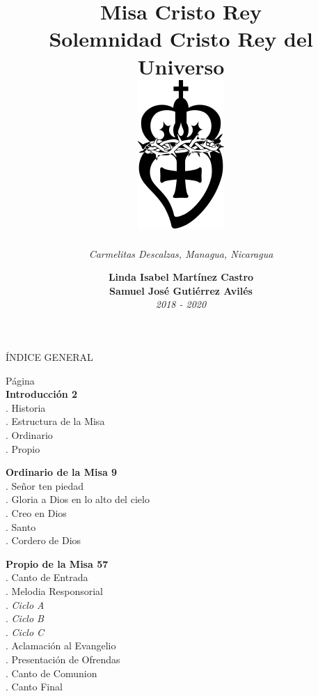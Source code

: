 \documentclass[12pt, letterpaper]{report}
\title{
  \textbf{ \Huge Misa Cristo Rey  } \\
  { \LARGE Solemnidad Cristo Rey del Universo } \\
  \vspace{2em}
  \includegraphics{logo}
}
\author{ \textit{ \large Carmelitas Descalzas, Managua, Nicaragua } }
\date{ \Large \textbf{Linda Isabel Mart\'inez Castro \\ Samuel Jos\'e Guti\'errez Avil\'es} \\ \small \textit{2018 - 2020} }
\begin{document}
    \maketitle

    \LARGE ÍNDICE GENERAL

    \large \hfill{Página}\\
    \Large \textbf{Introducción \hfill{2}}\\
    .\hspace{1cm} \large Historia \\
    .\hspace{1cm} \large Estructura de la Misa \\
    .\hspace{1cm} \large Ordinario \\
    .\hspace{1cm} \large Propio 

    \noindent
    \Large \textbf{Ordinario de la Misa \hfill{9}}\\
    .\hspace{1cm} \large Señor ten piedad \\
    .\hspace{1cm} \large Gloria a Dios en lo alto del cielo \\
    .\hspace{1cm} \large Creo en Dios \\
    .\hspace{1cm} \large Santo \\
    .\hspace{1cm} \large Cordero de Dios 

    \noindent
    \Large \textbf{Propio de la Misa \hfill{57}}\\
    .\hspace{1cm} \large Canto de Entrada \\
    .\hspace{1cm} \large Melodia Responsorial \\
    .\hspace{2cm} \large \textit{Ciclo A} \\
    .\hspace{2cm} \large \textit{Ciclo B} \\
    .\hspace{2cm} \large \textit{Ciclo C} \\
    .\hspace{1cm} \large Aclamaci\'on al Evangelio \\
    .\hspace{1cm} \large Presentación de Ofrendas \\
    .\hspace{1cm} \large Canto de Comunion \\
    .\hspace{1cm} \large Canto Final 
    \clearpage
\end{document}
